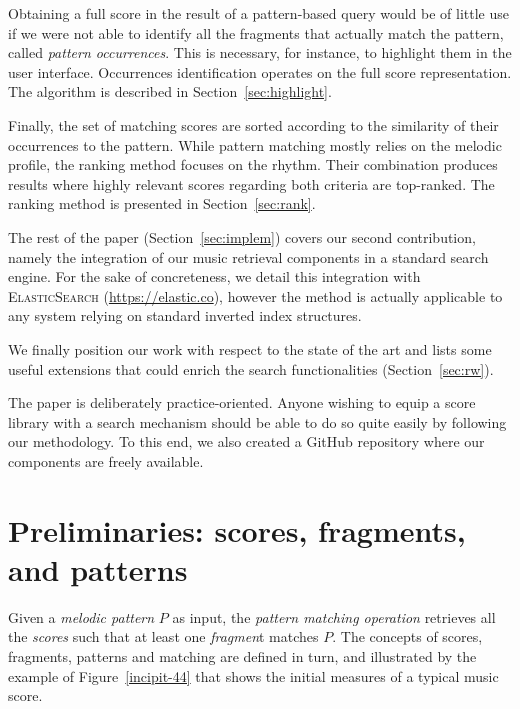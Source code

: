 \documentclass[letterpaper, 11pt]{article}
\def\neuma/{\textsc{Anonymized}}
\def\elasticsearch/{\textsc{ElasticSearch}}
\begin{document}
Obtaining a full score in the result of a pattern-based query would be of little
use if we were not able to identify all the fragments that actually match the pattern,
called \emph{pattern occurrences}. This is necessary,  for instance,
to highlight them in the user interface. Occurrences identification operates on the full score
representation. 
The  algorithm is
described in  Section~\ref{sec:highlight}.

Finally, the set of matching scores  are sorted according to 
the similarity of their occurrences to the pattern. While pattern matching mostly relies 
on the melodic profile, the ranking
method focuses on the rhythm. Their combination produces results  where highly relevant scores regarding
both criteria are top-ranked. The ranking method is presented in Section~\ref{sec:rank}.

The rest of the paper (Section~\ref{sec:implem}) covers our second contribution, namely the integration
of our music retrieval components  in a standard search engine. For the sake of concreteness, we
detail this integration with \elasticsearch/ (\url{https://elastic.co}), however the method is actually applicable to any system relying
on standard inverted index structures. 

We finally  position our work with respect to the state of the art
and lists some useful extensions that could enrich the search functionalities (Section~\ref{sec:rw}).

\smallskip

The paper is deliberately  practice-oriented. Anyone wishing to equip a score library with a search 
mechanism should be able to do so quite easily by following our methodology. To this end,
we also created  a GitHub repository  where our components are freely available.

\section{Preliminaries: scores, fragments, and patterns}\label{sec:prelim} 

Given a \emph{melodic pattern} $P$ as input, the \emph{pattern matching operation}
retrieves all the \emph{scores} such that at least one \emph{fragmen}t matches $P$. The concepts
of scores, fragments, patterns and matching are defined in turn, and illustrated by the example 
of Figure~\ref{incipit-44} that shows the initial measures of a typical music score.   
\end{document}

